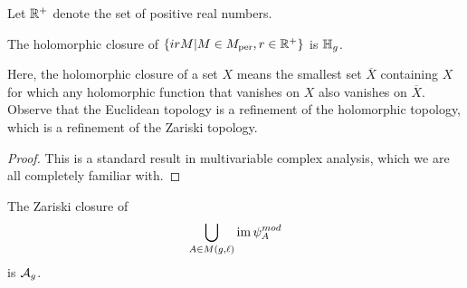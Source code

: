 \documentclass{amsart}
\begin{document}
Let $\mathbb{R}^+$ denote the set of positive real numbers.
\begin{lemma}\label{lemma:holomorphic-closure-irM}
  The holomorphic closure of ${\{ irM | M \in M_{\textrm{per}}, r \in \mathbb{R}^+\}}$ is $\mathbb{H}_g$.
\end{lemma}
Here, the holomorphic closure of a set $X$ means the smallest set $\overline{X}$ containing $X$ for which any holomorphic function that vanishes on $X$ also vanishes on $\overline{X}$. Observe that the Euclidean topology is a refinement of the holomorphic topology, which is a refinement of the Zariski topology.

\begin{proof}
  This is a standard result in multivariable complex analysis, which we are all completely familiar with.
\end{proof}





\begin{theorem}
  The Zariski closure of
  \[
    {\bigcup_{A \in M(g,\ell)} \operatorname{im} \psi_{A}^{mod}}
  \]
  is $\mathcal{A}_g$.
\end{theorem}
\end{document}
